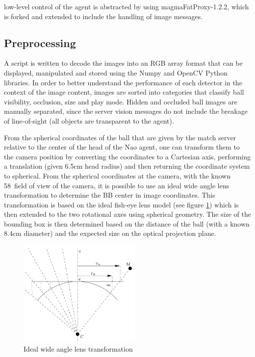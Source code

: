 \documentclass[a4paper,twoside,12pt]{report}
\begin{document}
low-level control of the agent is abstracted by using magmaFatProxy-1.2.2, which is forked and extended to include the handling of image messages.

\subsection{Preprocessing}

A script is written to decode the images into an RGB array format that can be displayed, manipulated and stored using the Numpy and OpenCV Python libraries. In order to better understand the performance of each detector in the context of the image content, images are sorted into categories that classify ball visibility, occlusion, size and play mode. Hidden and occluded ball images are manually separated, since the server vision messages do not include the breakage of line-of-sight (all objects are transparent to the agent).

From the spherical coordinates of the ball that are given by the match server relative to the center of the head of the Nao agent, one can transform them to the camera position by converting the coordinates to a Cartesian axis, performing a translation (given 6.5cm head radius) and then returning the coordinate system to spherical. From the spherical coordinates at the camera, with the known 58\textdegree\ field of view of the camera, it is possible to use an ideal wide angle lens transformation to determine the BB center in image coordinates. This transformation is based on the ideal fish-eye lens model (see figure \ref{fig:wideangle}) which is then extended to the two rotational axes using spherical geometry. The size of the bounding box is then determined based on the distance of the ball (with a known 8.4cm diameter) and the expected size on the optical projection plane.

\begin{figure}[h!]
\begin{center}
\includegraphics[width=6cm]{images/FOVmodel.jpg}
\caption{Ideal wide angle lens transformation \citep{wideangle} }
\label{fig:wideangle}
\end{center}
\end{figure}
\end{document}
